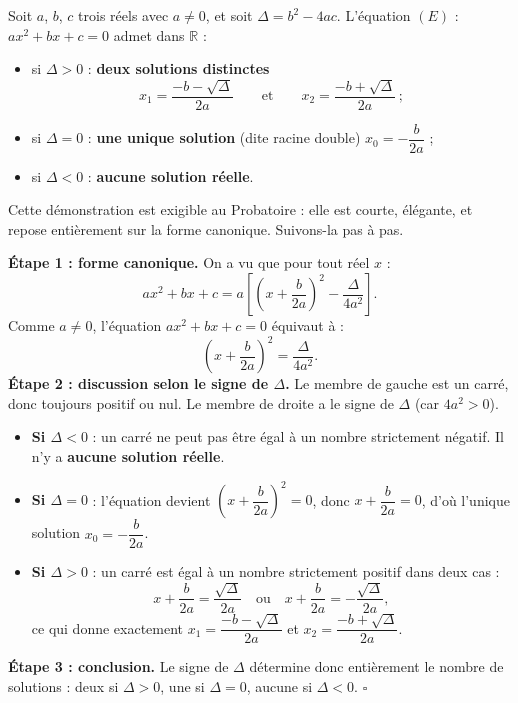 \documentclass[11pt]{article}
\newcommand{\cle}[1]{{\popxbold\color{popdark}#1}}
\begin{document}
\begin{propriete}[Résolution de l'équation $ax^2+bx+c=0$ dans $\mathbb{R}$ — démonstration exigible]
Soit $a$, $b$, $c$ trois réels avec $a\neq 0$, et soit $\Delta=b^2-4ac$. L'équation $(E)$ : $ax^2+bx+c=0$ admet dans $\mathbb{R}$ :
\begin{itemize}
\item si $\Delta>0$ : \textbf{deux solutions distinctes}
\[
x_1=\dfrac{-b-\sqrt{\Delta}}{2a}\qquad\text{et}\qquad x_2=\dfrac{-b+\sqrt{\Delta}}{2a}\,;
\]
\item si $\Delta=0$ : \textbf{une unique solution} (dite \cle{racine double}) $x_0=-\dfrac{b}{2a}$ ;
\item si $\Delta<0$ : \textbf{aucune solution réelle}.
\end{itemize}
\end{propriete}

Cette démonstration est exigible au Probatoire : elle est courte, élégante, et repose entièrement sur la forme canonique. Suivons-la pas à pas.

\begin{experience}
\textbf{Étape 1 : forme canonique.} On a vu que pour tout réel $x$ :
\[
ax^2+bx+c=a\left[\left(x+\dfrac{b}{2a}\right)^2-\dfrac{\Delta}{4a^2}\right].
\]
Comme $a\neq 0$, l'équation $ax^2+bx+c=0$ équivaut à :
\[
\left(x+\dfrac{b}{2a}\right)^2=\dfrac{\Delta}{4a^2}.
\]
\textbf{Étape 2 : discussion selon le signe de $\Delta$.} Le membre de gauche est un carré, donc toujours positif ou nul. Le membre de droite a le signe de $\Delta$ (car $4a^2>0$).
\begin{itemize}
\item \textbf{Si $\Delta<0$} : un carré ne peut pas être égal à un nombre strictement négatif. Il n'y a \textbf{aucune solution réelle}.
\item \textbf{Si $\Delta=0$} : l'équation devient $\left(x+\dfrac{b}{2a}\right)^2=0$, donc $x+\dfrac{b}{2a}=0$, d'où l'unique solution $x_0=-\dfrac{b}{2a}$.
\item \textbf{Si $\Delta>0$} : un carré est égal à un nombre strictement positif dans deux cas :
\[
x+\dfrac{b}{2a}=\dfrac{\sqrt{\Delta}}{2a}\quad\text{ou}\quad x+\dfrac{b}{2a}=-\dfrac{\sqrt{\Delta}}{2a},
\]
ce qui donne exactement $x_1=\dfrac{-b-\sqrt{\Delta}}{2a}$ et $x_2=\dfrac{-b+\sqrt{\Delta}}{2a}$.
\end{itemize}
\textbf{Étape 3 : conclusion.} Le signe de $\Delta$ détermine donc entièrement le nombre de solutions : deux si $\Delta>0$, une si $\Delta=0$, aucune si $\Delta<0$. $\square$
\end{experience}
\end{document}
